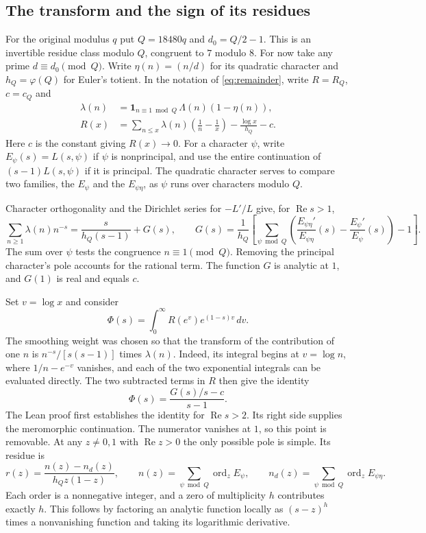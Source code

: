 \documentclass[11pt,letterpaper]{article}
\renewcommand{\Re}{\operatorname{Re}}
\begin{document}
\subsection{The transform and the sign of its residues}

For the original modulus $q$ put $Q=18480q$ and $d_0=Q/2-1$.
This is an invertible residue class modulo $Q$, congruent to $7$ modulo
$8$. For now take any prime $d\equiv d_0\pmod Q$. Write
$\eta(n)=(n/d)$ for its quadratic character and $h_Q=\varphi(Q)$
for Euler's totient. In the notation of \eqref{eq:remainder}, write $R=R_Q$, $c=c_Q$ and
\begin{align*}
 \lambda(n)&=\mathbf1_{n\equiv1\bmod Q}\,\Lambda(n)(1-\eta(n)),\\
 R(x)&=\sum_{n\le x}\lambda(n)\left(\frac1n-\frac1x\right)
       -\frac{\log x}{h_Q}-c.
\end{align*}
Here $c$ is the constant giving $R(x)\to0$. For a character $\psi$,
write $E_\psi(s)=L(s,\psi)$ if $\psi$ is nonprincipal, and use the
entire continuation of $(s-1)L(s,\psi)$ if it is principal. The
quadratic character serves to compare two families, the $E_\psi$ and the
$E_{\psi\eta}$, as $\psi$ runs over characters modulo $Q$.

Character orthogonality and the Dirichlet series for $-L'/L$ give, for
$\Re s>1$,
\[
 \sum_{n\ge1}\lambda(n)n^{-s}=\frac{s}{h_Q(s-1)}+G(s),
 \qquad
 G(s)=\frac{1}{h_Q}\left[
 \sum_{\psi\bmod Q}\left(\frac{E_{\psi\eta}'}{E_{\psi\eta}}(s)
                 -\frac{E_\psi'}{E_\psi}(s)\right)-1\right].
\]
The sum over $\psi$ tests the congruence $n\equiv1\pmod Q$. Removing
the principal character's pole accounts for the rational term.
The function $G$ is analytic at $1$, and $G(1)$ is real and equals $c$.

Set $v=\log x$ and consider
\[
 \Phi(s)=\int_0^\infty R(e^v)e^{(1-s)v}\,dv.
\]
The smoothing weight was chosen so that the transform of the contribution
of one $n$ is $n^{-s}/[s(s-1)]$ times $\lambda(n)$. Indeed, its integral
begins at $v=\log n$, where $1/n-e^{-v}$ vanishes, and each of the two
exponential integrals can be evaluated directly. The two subtracted
terms in $R$ then give the identity
\[
 \Phi(s)=\frac{G(s)/s-c}{s-1}.
\]
The Lean proof first establishes the identity for $\Re s>2$. Its right
side supplies the meromorphic continuation. The numerator vanishes at
$1$, so this point is removable. At any $z\ne0,1$ with $\Re z>0$ the
only possible pole is simple. Its residue is
\[
 r(z)=\frac{n(z)-n_d(z)}{h_Q z(1-z)},\qquad
 n(z)=\sum_{\psi\bmod Q}\operatorname{ord}_z E_\psi,\qquad
 n_d(z)=\sum_{\psi\bmod Q}\operatorname{ord}_z E_{\psi\eta}.
\]
Each order is a nonnegative integer, and a zero of multiplicity $h$
contributes exactly $h$. This follows by factoring an analytic function
locally as $(s-z)^h$ times a nonvanishing function and taking its
logarithmic derivative.
\end{document}
